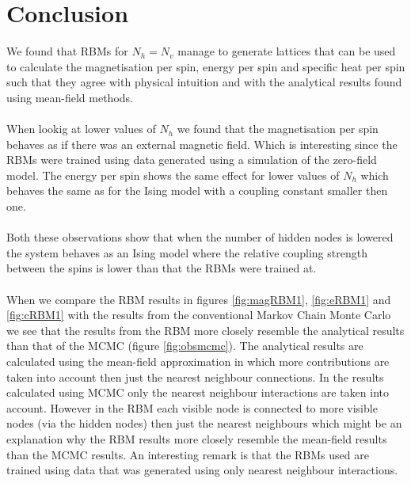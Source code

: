 \documentclass[10 pt, a4paper]{article}
\begin{document}
\section{Conclusion}

We found that RBMs for $N_h = N_v$ manage to generate lattices that can be used to calculate the magnetisation per spin, energy per spin and specific heat per spin such that they agree with physical intuition and with the analytical results found using mean-field methods.
\\
\\
When lookig at lower values of $N_h$ we found that the magnetisation per spin behaves as if there was an external magnetic field. Which is interesting since the RBMs were trained using data generated using a simulation of the zero-field model. The energy per spin shows the same effect for lower values of $N_h$ which behaves the same as for the Ising model with a coupling constant smaller then one.
\\
\\
Both these observations show that when the number of hidden nodes is lowered the system behaves as an Ising model where the relative coupling strength between the spins is lower than that the RBMs were trained at. 
\\
\\
When we compare the RBM results in figures \ref{fig:magRBM1}, \ref{fig:eRBM1} and \ref{fig:cRBM1} with the results from the conventional Markov Chain Monte Carlo we see that the results from the RBM more closely resemble the analytical results than that of the MCMC (figure \ref{fig:obsmcmc}). The analytical results are calculated using the mean-field approximation in which more contributions are taken into account then just the nearest neighbour connections. In the results calculated using MCMC only the nearest neighbour interactions are taken into account. However in the RBM each visible node is connected to more visible nodes (via the hidden nodes) then just the nearest neighbours which might be an explanation why the RBM results more closely resemble the mean-field results than the MCMC results. An interesting remark is that the RBMs used are trained using data that was generated using only nearest neighbour interactions. 
\end{document}

